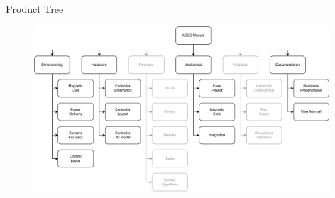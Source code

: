\begin{frame}{Product Tree}

    \begin{figure}[!ht]
        \begin{center}
            \includegraphics[width=11cm]{figures/product-tree-adcs.pdf}
        \end{center}
    \end{figure}

\end{frame}


